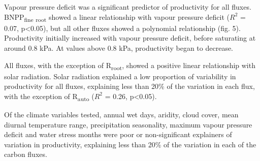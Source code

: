 \documentclass[]{article}
\begin{document}
Vapour pressure deficit was a significant predictor of productivity for
all fluxes. BNPP\textsubscript{fine} \textsubscript{root} showed a
linear relationship with vapour pressure deficit (\(R^2\) = 0.07,
p\textless{}0.05), but all other fluxes showed a polynomial relationship
(fig. 5). Productivity initially increased with vapour pressure deficit,
before saturating at around 0.8 kPa. At values above 0.8 kPa,
productivity began to decrease.

All fluxes, with the exception of R\textsubscript{root}, showed a
positive linear relationship with solar radiation. Solar radiation
explained a low proportion of variability in productivity for all
fluxes, explaining less than 20\% of the variation in each flux, with
the exception of R\textsubscript{auto} (\(R^2\) = 0.26,
p\textless{}0.05).

Of the climate variables tested, annual wet days, aridity, cloud cover,
mean diurnal temperature range, precipitation seasonality, maximum
vapour pressure deficit and water stress months were poor or
non-significant explainers of variation in productivity, explaining less
than 20\% of the variation in each of the carbon fluxes.
\end{document}
